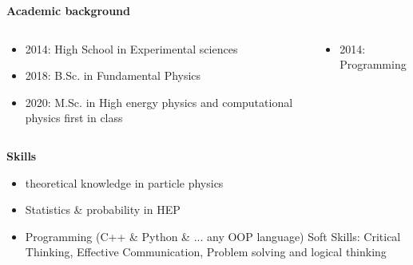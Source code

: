 \documentclass[11pt,aspectratio=169]{beamer}
\begin{document}
\begin{frame}{\underline{\secname}}
	
	\begin{center}
		\textbf{Academic background}
	\end{center}
	\begin{columns}
		\begin{column}{0.5\linewidth}
	
	\begin{itemize} 			  \setlength\itemsep{0em}

		\item 2014: High School in Experimental sciences
		\item 2018: B.Sc. in Fundamental Physics
		
		\item 2020: M.Sc. in High energy physics and computational physics first in class 
	\end{itemize}	

			\end{column}
		
	\pause	
		\begin{column}{0.5\linewidth}
		
	\begin{itemize}			  \setlength\itemsep{0em}

		\item 2014: Programming
	\end{itemize}
			\end{column}
	\end{columns}
	\pause
	\begin{center}
	\textbf{Skills}
\end{center}	
	\begin{itemize}			  \setlength\itemsep{0em}
\item
theoretical knowledge in particle physics
\item
Statistics \& probability in HEP 
\item
Programming (C++ \& Python \& ... any OOP language)
Soft Skills: Critical Thinking, Effective Communication, Problem solving and logical thinking






\end{itemize}
\end{frame}
\end{document}
